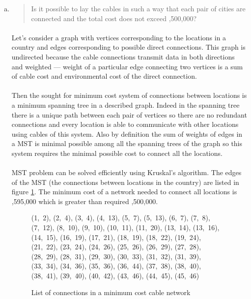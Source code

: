 \begin{enumerate}[(a)]
\item \begin{quote}Is it possible to lay the cables in such a way that each pair of cities are connected
and the total cost does not exceed ,500,000?\end{quote}

	\paragraph{}
	Let's consider a graph with vertices corresponding to the locations in a country and edges corresponding to possible direct connections. This graph is undirected because the cable connections transmit data in both directions and weighted --- weight of a particular edge connecting two vertices is a sum of cable cost and environmental cost of the direct connection.

	\paragraph{}
	Then the sought for minimum cost system of connections between locations is a minimum spanning tree in a described graph. Indeed in the spanning tree there is a unique path between each pair of vertices so there are no redundant connections and every location is able to communicate with other locations using cables of this system. Also by definition the sum of weights of edges in a MST is minimal possible among all the spanning trees of the graph so this system requires the minimal possible cost to connect all the locations.

	\paragraph{}
	MST problem can be solved efficiently using Kruskal's algorithm. The edges of the MST (the connections between locations in the country) are listed in figure \ref{mst2-2-a}. The minimum cost of a network needed to connect all locations is ,595,000 which is greater than required ,500,000.

\begin{figure}[H]
	\centering
	\begin{multicols}{5}
(1,~2), (2,~4), (3,~4), (4,~13), (5,~7), (5,~13), (6,~7), (7,~8), (7,~12), (8,~10), (9,~10), (10,~11), (11,~20), (13,~14), (13,~16), (14,~15), (16,~19), (17,~21), (18,~19), (18,~22), (19,~24), (21,~22), (23,~24), (24,~26), (25,~26), (26,~29), (27,~28), (28,~29), (28,~31), (29,~30), (30,~33), (31,~32), (31,~39), (33,~34), (34,~36), (35,~36), (36,~44), (37,~38), (38,~40), (38,~41), (39,~40), (40,~42), (43,~46), (44,~45), (45,~46)
	\end{multicols}
	\caption{List of connections in a minimum cost cable network}
	\label{mst2-2-a}
\end{figure}


\end{enumerate}
